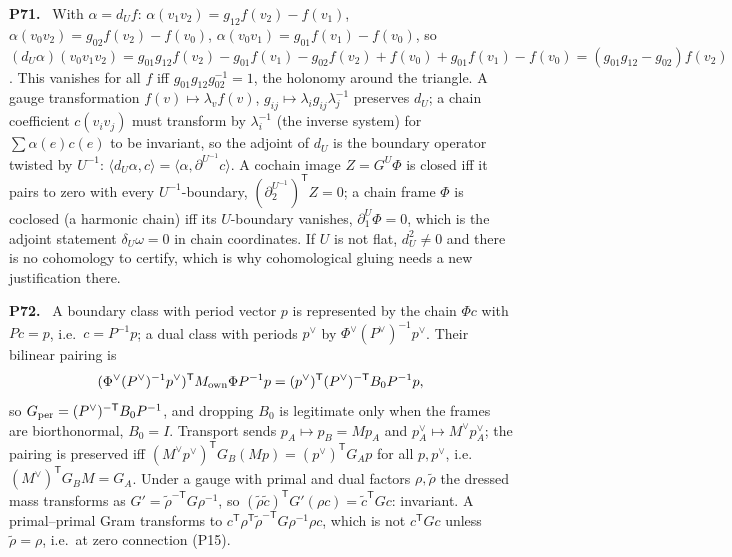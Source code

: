 \documentclass[11pt]{article}
\newenvironment{solution}[1]{\medskip\noindent\textbf{P#1.}\ }{\par\medskip}
\begin{document}
\begin{solution}{71}
With $\alpha = d_Uf$: $\alpha(v_1v_2) = g_{12}f(v_2)-f(v_1)$, $\alpha(v_0v_2) = g_{02}f(v_2)-f(v_0)$,
$\alpha(v_0v_1) = g_{01}f(v_1)-f(v_0)$, so
$(d_U\alpha)(v_0v_1v_2) = g_{01}g_{12}f(v_2)-g_{01}f(v_1)-g_{02}f(v_2)+f(v_0)+g_{01}f(v_1)-f(v_0)
= (g_{01}g_{12}-g_{02})f(v_2)$. This vanishes for all $f$ iff
$g_{01}g_{12}g_{02}^{-1} = 1$, the holonomy around the triangle. A gauge
transformation $f(v)\mapsto\lambda_vf(v)$, $g_{ij}\mapsto\lambda_ig_{ij}\lambda_j^{-1}$
preserves $d_U$; a chain coefficient $c(v_iv_j)$ must transform by
$\lambda_i^{-1}$ (the inverse system) for $\sum\alpha(e)c(e)$ to be invariant,
so the adjoint of $d_U$ is the boundary operator twisted by $U^{-1}$:
$\langle d_U\alpha,c\rangle = \langle\alpha,\partial^{U^{-1}}c\rangle$.
A cochain image $Z = G^U\Phi$ is closed iff it pairs to zero with every
$U^{-1}$-boundary, $(\partial_2^{U^{-1}})^{\mathsf T}Z = 0$; a chain frame
$\Phi$ is coclosed (a harmonic chain) iff its $U$-boundary vanishes,
$\partial_1^U\Phi = 0$, which is the adjoint statement $\delta_U\omega = 0$ in
chain coordinates. If $U$ is not flat, $d_U^2\ne0$ and there is no cohomology
to certify, which is why cohomological gluing needs a new justification there.
\end{solution}

\begin{solution}{72}
A boundary class with period vector $p$ is represented by the chain
$\Phi c$ with $Pc = p$, i.e.\ $c = P^{-1}p$; a dual class with periods $p^\vee$
by $\Phi^\vee(P^\vee)^{-1}p^\vee$. Their bilinear pairing is
\[
 (\Phi^\vee(P^\vee)^{-1}p^\vee)^{\mathsf T}M_{\rm own}\Phi P^{-1}p
= (p^\vee)^{\mathsf T}(P^\vee)^{-\mathsf T}B_0P^{-1}p,
\]
so $G_{\rm per} = (P^\vee)^{-\mathsf T}B_0P^{-1}$, and dropping $B_0$ is legitimate only when the frames are biorthonormal,
$B_0 = I$. Transport sends $p_A\mapsto p_B = Mp_A$ and $p^\vee_A\mapsto M^\vee p^\vee_A$;
the pairing is preserved iff $(M^\vee p^\vee)^{\mathsf T}G_B(Mp) = (p^\vee)^{\mathsf T}G_Ap$
for all $p,p^\vee$, i.e.\ $(M^\vee)^{\mathsf T}G_BM = G_A$. Under a gauge with
primal and dual factors $\rho,\tilde\rho$ the dressed mass transforms as
$G' = \tilde\rho^{-\mathsf T}G\rho^{-1}$, so $(\tilde\rho\tilde c)^{\mathsf T}G'(\rho c) = \tilde c^{\mathsf T}Gc$:
invariant. A primal--primal Gram transforms to $c^{\mathsf T}\rho^{\mathsf T}\tilde\rho^{-\mathsf T}G\rho^{-1}\rho c$,
which is not $c^{\mathsf T}Gc$ unless $\tilde\rho = \rho$, i.e.\ at zero
connection (P15).
\end{solution}
\end{document}
